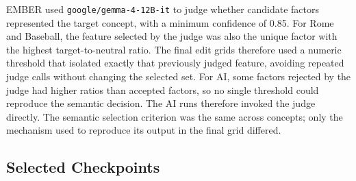 EMBER used \texttt{google/gemma-4-12B-it} to judge whether candidate factors
represented the target concept, with a minimum confidence of 0.85. For Rome
and Baseball, the feature selected by the judge was also the unique factor
with the highest target-to-neutral ratio. The final edit grids therefore used
a numeric threshold that isolated exactly that previously judged feature,
avoiding repeated judge calls without changing the selected set. For AI,
some factors rejected by the judge had higher ratios than accepted factors,
so no single threshold could reproduce the semantic decision. The AI runs
therefore invoked the judge directly. The semantic selection criterion was
the same across concepts; only the mechanism used to reproduce its output in
the final grid differed.

\subsection{Selected Checkpoints}

